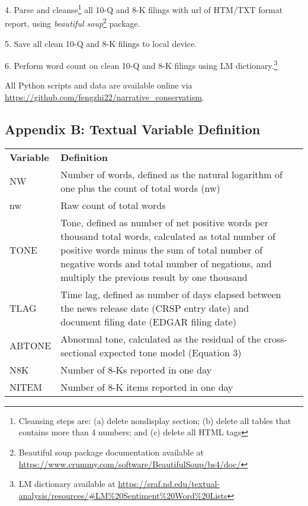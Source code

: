4. Parse and cleanse\footnote{Cleansing steps are: (a) delete nondisplay section; (b) delete all tables that contains more than 4 numbers; and (c) delete all HTML tags} all 10-Q and 8-K filings with url of HTM/TXT format report, using \textit{beautiful soup}\footnote{Beautiful soup package documentation available at \url{https://www.crummy.com/software/BeautifulSoup/bs4/doc/}} package. 

5. Save all clean 10-Q and 8-K filings to local device. 

6. Perform word count on clean 10-Q and 8-K filings using LM dictionary.\footnote{LM dictionary available at \url{https://sraf.nd.edu/textual-analysis/resources/\#LM\%20Sentiment\%20Word\%20Lists}}

All Python scripts and data are available online via \url{https://github.com/fengzhi22/narrative_conservatism}.

\subsection*{Appendix B: Textual Variable Definition}
\label{appb}
\begin{table}[H]
	\centering
	\begin{tabular}{lp{15cm}p{15cm}}
		\textbf{Variable} & \textbf{Definition} \\
		NW & Number of words, defined as the natural logarithm of one plus the count of total words (nw)\\
		nw & Raw count of total words\\
		TONE & Tone, defined as number of net positive words per thousand total words, calculated as total number of positive words minus the sum of total number of negative words and total number of negations, and multiply the previous result by one thousand\\
		TLAG & Time lag, defined as number of days elapsed between the news release date (CRSP entry date) and document filing date (EDGAR filing date)\\
		ABTONE & Abnormal tone, calculated as the residual of the cross-sectional expected tone model (Equation 3)\\
		N8K & Number of 8-Ks reported in one day\\
		NITEM & Number of 8-K items reported in one day\\
		
	\end{tabular}%
\end{table}%


